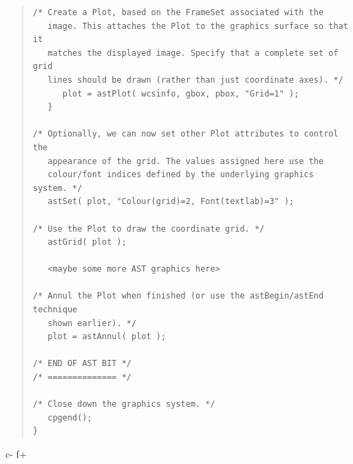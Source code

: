\documentclass[twoside,11pt]{article}
\begin{document}
\begin{quote}
\begin{verbatim}
/* Create a Plot, based on the FrameSet associated with the
   image. This attaches the Plot to the graphics surface so that it
   matches the displayed image. Specify that a complete set of grid
   lines should be drawn (rather than just coordinate axes). */
      plot = astPlot( wcsinfo, gbox, pbox, "Grid=1" );
   }

/* Optionally, we can now set other Plot attributes to control the
   appearance of the grid. The values assigned here use the
   colour/font indices defined by the underlying graphics system. */
   astSet( plot, "Colour(grid)=2, Font(textlab)=3" );

/* Use the Plot to draw the coordinate grid. */
   astGrid( plot );

   <maybe some more AST graphics here>

/* Annul the Plot when finished (or use the astBegin/astEnd technique
   shown earlier). */
   plot = astAnnul( plot );

/* END OF AST BIT */
/* ============== */

/* Close down the graphics system. */
   cpgend();
}
\end{verbatim}
\normalsize
\end{quote}
c-
f+
\small
\end{document}
